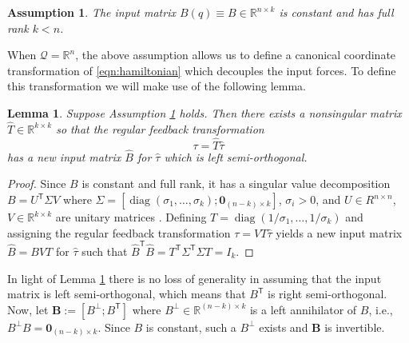\documentclass[journal,twoside,web, twocolumn,draftcls]{ieeecolor}
\newtheorem{lemma}{Lemma} %
\newtheorem{assm}{Assumption} %
\DeclareMathOperator{\Diag}{diag}
\newcommand*{\diag}[1]{\Diag\left(#1\right)}
\newcommand*{\tpose}{^\mathsf{T}}
\newcommand*{\R}{\mathbb{R}}
\newcommand*{\Id}[1]{I_{#1}}
\newcommand*{\Zmat}[1]{\bm{0}_{#1}}
\begin{document}
\begin{assm}\label{assm:B-const}
    The input matrix \(B(q) \equiv B \in \R^{n\times k}\) is constant
    and has full rank \(k < n\).
\end{assm}

%
%
When \(\mathcal{Q} = \R^n\), the above assumption allows us to define a
canonical coordinate transformation of \eqref{eqn:hamiltonian} 
which decouples the input forces.
To define this transformation we will make use of the following lemma.

\begin{lemma}\label{lemma:B-orthogonal}
    Suppose Assumption \ref{assm:B-const} holds. Then
    there exists a nonsingular matrix \(\hat{T} \in \R^{k \times k}\) 
    so that the regular feedback transformation 
    \[
        \tau = \hat{T} \hat{\tau}
    \] 
    has a new input matrix \(\hat{B}\) for \(\hat{\tau}\) which is left
    semi-orthogonal.  
\end{lemma}
\begin{proof}
    Since \(B\) is constant and full rank, it has a singular value decomposition 
    \(B = U\tpose \Sigma V\) where 
    \(\Sigma = [\diag{\sigma_1,\ldots,\sigma_k}; \Zmat{(n-k)\times k}]\),
    \(\sigma_i > 0\), and \(U \in R^{n \times n}\),
    \(V \in \R^{k \times k}\) are unitary matrices \cite{calculating_svd}.
    Defining \(T = \diag{1/\sigma_1,\ldots,1/\sigma_k}\) and assigning the
    regular feedback transformation \(\tau = V T \hat{\tau}\) yields a new input
    matrix \(\hat{B} = B V T\) for \(\hat{\tau}\) such that
    \(\hat{B}\tpose \hat{B} = T\tpose \Sigma\tpose \Sigma T = \Id{k}\).
\end{proof}

In light of Lemma \ref{lemma:B-orthogonal} there is no loss of generality in
assuming that the input matrix is left semi-orthogonal, which means that
\(B\tpose\) is right semi-orthogonal.
Now, let \(\mathbf{B} := [B^\perp; B\tpose]\) where 
\(B^\perp \in \R^{(n-k)\times k}\) is a left annihilator of \(B\), i.e.,
\(B^\perp B = \Zmat{(n-k) \times k}\).
Since \(B\) is constant, such a \(B^\perp\) exists and
\(\mathbf{B}\) is invertible.
\end{document}
